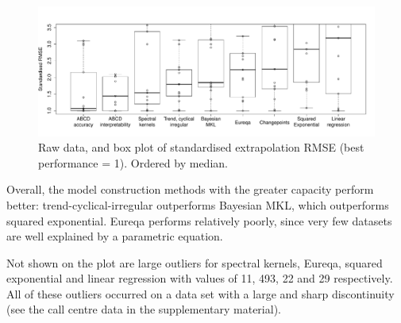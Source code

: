 \documentclass[letterpaper]{article}
\newcommand{\procedurename}{ABCDE}
\begin{document}
\begin{figure}[ht]
\centering
\includegraphics[width=\textwidth]{figures/box_extrap_wide}
\caption{
Raw data, and box plot of standardised extrapolation RMSE (best performance = 1).
Ordered by median.
}
\label{fig:box_extrap_dist}
\end{figure}

Overall, the model construction methods with the greater capacity perform better: trend-cyclical-irregular outperforms Bayesian MKL, which outperforms squared exponential.
Eureqa performs relatively poorly, since very few datasets are well explained by a parametric equation.

Not shown on the plot are large outliers for spectral kernels, Eureqa, squared exponential and linear regression with values of 11, 493, 22 and 29 respectively.
All of these outliers occurred on a data set with a large and sharp discontinuity (see the call centre data in the supplementary material).


\end{document}

